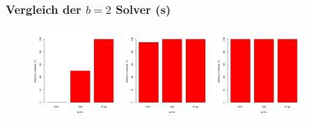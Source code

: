 \documentclass{beamer}
\begin{document}
\begin{frame}
\frametitle{Vergleich der $b = 2$ Solver (s)}

\begin{figure}
\centering
\includegraphics[width=0.3\textwidth]{images/solver_instance_coverage_b=2_s_1s.png}
\includegraphics[width=0.3\textwidth]{images/solver_instance_coverage_b=2_s_3s.png}
\includegraphics[width=0.3\textwidth]{images/solver_instance_coverage_b=2_s_5s.png}
\caption*{\textsc{Zeitlimit 1s} $\quad\quad\quad\quad$ \textsc{Zeitlimit 3s} $\quad\quad\quad\quad$ \textsc{Zeitlimit 5s}}
\begin{subfigure}[b]{0.3\textwidth}
\centering
{}
\end{subfigure}
\end{figure}
\end{frame}
\end{document}

